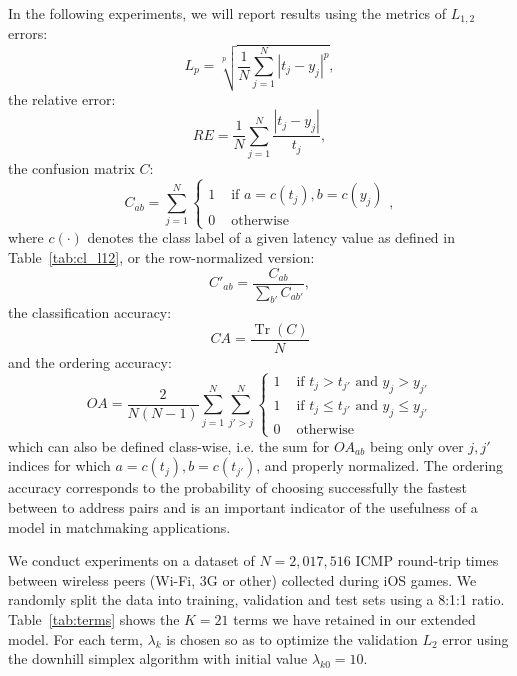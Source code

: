 \documentclass[10pt,a4paper,notitlepage,twocolumn]{article}
\begin{document}
In the following experiments, we will report results using the metrics of $L_{1,2}$ errors:
\begin{equation}
L_p = \sqrt[p]{\frac1N\sum_{j=1}^N |t_j-y_j|^p},
\end{equation}
%
the relative error:
\begin{equation}
RE = \frac1N\sum_{j=1}^N \frac{|t_j-y_j|}{t_j},
\end{equation}
%
the confusion matrix $C$:
\begin{equation}
C_{ab} = \sum_{j=1}^N
\begin{cases}
1 & \text{ if } a=c(t_j),b=c(y_j) \\ 
0 & \text{ otherwise}
\end{cases},
\end{equation}
where $c(\cdot)$ denotes the class label of a given latency value as defined in Table~\ref{tab:cl_l12},
or the row-normalized version:
\begin{equation}
C'_{ab} = \frac{C_{ab}}{\sum_{b'} C_{ab'}},
\end{equation}
%
the classification accuracy:
\begin{equation}
CA = \frac{\operatorname{Tr}(C)}N
\end{equation}
%
and the ordering accuracy:
\begin{equation}
OA = \frac2{N(N-1)}\sum_{j=1}^N\sum_{j'>j}^N
\begin{cases}
1 & \text{ if } t_j > t_{j'} \text{ and } y_j > y_{j'} \\
1 & \text{ if } t_j \le t_{j'} \text{ and } y_j \le y_{j'} \\
0 & \text{ otherwise}
\end{cases}
\end{equation}
which can also be defined class-wise, i.e. the sum for $OA_{ab}$ being only over $j,j'$ indices for which $a=c(t_j),b=c(t_{j'})$, and properly normalized.
The ordering accuracy corresponds to the probability of choosing successfully the fastest between to address pairs and is an important indicator of the usefulness of a model in matchmaking applications.


We conduct experiments on a dataset of $N=2,017,516$ ICMP round-trip times between wireless peers (Wi-Fi, 3G or other) collected during iOS games.
We randomly split the data into training, validation and test sets using a 8:1:1 ratio.
Table~\ref{tab:terms} shows the $K=21$ terms we have retained in our extended model.
For each term, $\lambda_k$ is chosen so as to optimize the validation $L_2$ error using the downhill simplex algorithm with initial value $\lambda_{k0}=10$.
\end{document}
